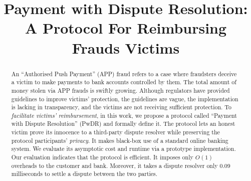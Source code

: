 \documentclass[compsoc, conference, a4paper, 10pt, times]{IEEEtran}
\begin{document}
\title{Payment with Dispute Resolution: \\ A Protocol For Reimbursing Frauds Victims}


\iffalse
\author{\IEEEauthorblockN{1\textsuperscript{st} Given Names Surname}
\IEEEauthorblockA{\textit{Affiliation} \\
City, Country \\
email address or website URL}
\and
\IEEEauthorblockN{2\textsuperscript{nd} Given Names Surname}
\IEEEauthorblockA{\textit{Affiliation} \\
City, Country \\
email address or website URL}
\and
\IEEEauthorblockN{3\textsuperscript{rd} Given Names Surname}
\IEEEauthorblockA{\textit{Affiliation} \\
City, Country \\
email address or website URL}
}
\fi

\maketitle

\begin{abstract}
An ``Authorised Push Payment'' (APP) fraud refers to a case where fraudsters deceive a victim to make payments to bank accounts controlled by them.  The total amount of money stolen via APP frauds is swiftly growing. Although regulators have provided guidelines to improve victims’ protection, the guidelines are vague, the implementation is lacking in transparency, and the victims are not receiving sufficient protection. To  \emph{facilitate victims' reimbursement}, in this work, we propose a protocol called  ``Payment with Dispute Resolution'' (PwDR) and formally define it. The protocol lets an honest victim prove its innocence to a third-party dispute resolver while preserving the protocol participants' \emph{privacy}. It makes black-box use of a standard online banking system. We evaluate its asymptotic cost and runtime via a prototype implementation. Our evaluation indicates that the protocol is efficient. It imposes only $O(1)$ overheads to the customer and bank.  Moreover, it takes a dispute resolver only $0.09$ milliseconds to settle a dispute between the two parties.
\end{abstract}
\end{document}
